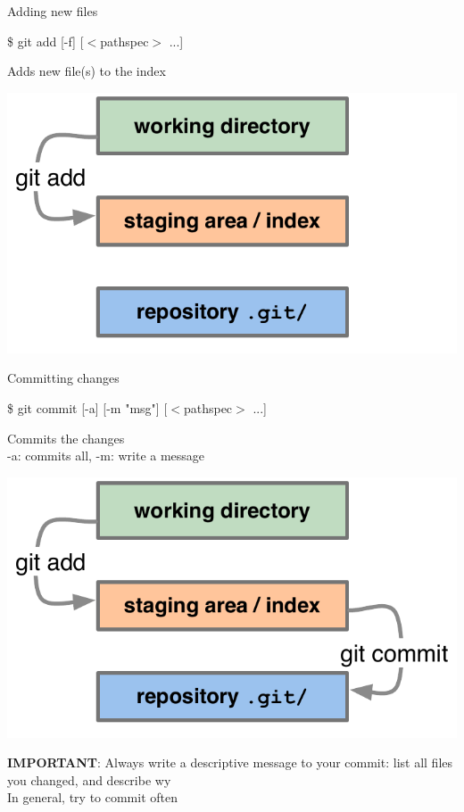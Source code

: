 \documentclass[10pt,xcolor=dvipsnames]{beamer}
\begin{document}
\begin{frame}{Adding new files}
\begin{block}{}
\$ git add [-f] [$<$pathspec$>$ ...]
\end{block}
Adds new file(s) to the index
\begin{center}
\includegraphics[scale=0.3]{diagrams_add_commit-02.pdf}
\end{center}
\end{frame}

\begin{frame}{Committing changes}
\begin{block}{}
\$ git commit [-a] [-m "msg"] [$<$pathspec$>$ ...]
\end{block}
Commits the changes\\
-a: commits all,
-m: write a message
\begin{center}
\includegraphics[scale=0.3]{diagrams_add_commit-03.pdf}
\end{center}
\pause
{\bf IMPORTANT}: Always write a descriptive message to your commit: list all files you changed, and describe wy\\
In general, try to commit often
\end{frame}
\end{document}
